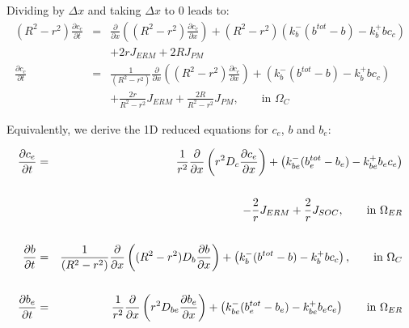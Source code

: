 \documentclass[review,supplement,onefignum,onetabnum]{siamart190516}
\begin{document}
Dividing by $\Delta x$ and taking $\Delta x$ to $0$ leads to:
\begin{eqnarray*}
    (R^2 - r^2) \frac{\partial c_c}{\partial t} &=& \frac{\partial}{\partial x}\left((R^2-r^2) \frac{\partial c_c}{\partial x}\right) + (R^2-r^2)(k_b^-(b^{tot}-b)-k_b^+bc_c) \\
    && + 2rJ_{ERM} + 2RJ_{PM}\\
    \frac{\partial c_c}{\partial t} &=& \frac{1}{(R^2 - r^2)} \frac{\partial}{\partial x}\left((R^2 - r^2) \frac{\partial c_c}{\partial x}\right) + (k_b^-(b^{tot}-b)-k_b^+bc_c) \\
    && +\frac{2r}{R^2-r^2}J_{ERM} + \frac{2R}{R^2-r^2}J_{PM}, \qquad \text{in $\Omega_{C}$}
\end{eqnarray*}

Equivalently, we derive the 1D reduced equations for $c_e$, $b$ and $b_e$:

\begin{eqnarray*}
    \frac{\partial c_e}{\partial t}&=&\frac{1}{r^2}\frac{\partial}{\partial x}\left(r^2D_c\frac{\partial c_e}{\partial x}\right) + \left(k_{be}^-(b_e^{tot}-b_e)-k_{be}^+b_ec_e\right) \\ \notag \\
    && -\frac{2}{r}J_{ERM} + \frac{2}{r}J_{SOC}, \qquad \text{in $\Omega_{ER}$} \notag \\ \notag \\
    \frac{\partial b}{\partial t}&=&\frac{1}{(R^2-r^2)}\frac{\partial}{\partial x}\left((R^2-r^2)D_b\frac{\partial b}{\partial x}\right)+\left(k_b^-(b^{tot}-b)-k_b^+bc_c\right), \qquad \text{in $\Omega_{C}$}\\  \notag \\
    \frac{\partial b_e}{\partial t}&=&\frac{1}{r^2}\frac{\partial}{\partial x}\left(r^2D_{be}\frac{\partial b_e}{\partial x}\right)+\left(k_{be}^-(b_e^{tot}-b_e)-k_{be}^+b_ec_e\right) \qquad \text{in $\Omega_{ER}$}%
\end{eqnarray*}



\end{document}
